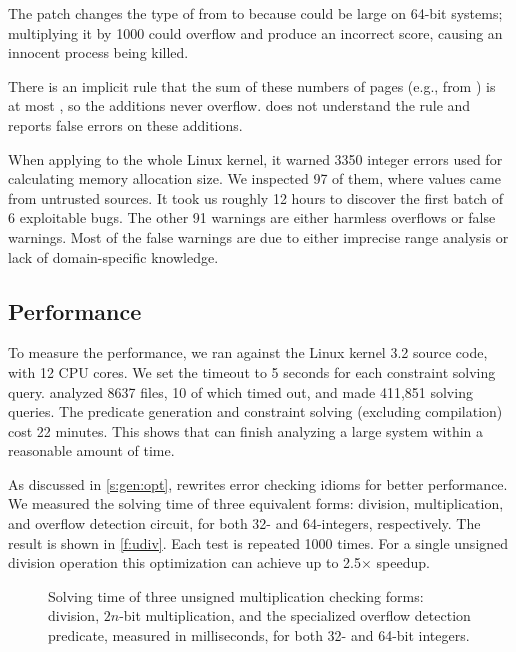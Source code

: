 The patch changes the type of  from  to  because
 could be large on 64-bit systems; multiplying it by
1000 could overflow and produce an incorrect score,
causing an innocent process being killed.

There is an implicit rule that the sum of these numbers of pages
(e.g., from ) is at most , so the
additions never overflow.  \sys does not understand the rule and
reports false errors on these additions.

When applying \sys to the whole Linux kernel,
it warned 3350 integer errors used for calculating
memory allocation size.  We inspected 97 of them,
where values came from untrusted sources. It took us roughly 12
hours to discover the first batch of 6 exploitable bugs.
The other 91 warnings are either harmless overflows or false warnings.
Most of the false warnings are due to either imprecise range analysis
or lack of domain-specific knowledge.


\subsection{Performance}
\label{s:eval:perf}

To measure the performance, we ran \sys against the Linux kernel
3.2 source code, with 12 CPU cores.  We set the timeout
to 5 seconds for each constraint solving query.   \sys analyzed
8637 files, 10 of which timed out, and made 411,851 solving queries.
The predicate generation and constraint solving (excluding compilation)
cost 22 minutes.  This shows that \sys can finish analyzing a large
system within a reasonable amount of time.

As discussed in \autoref{s:gen:opt}, \sys rewrites error checking
idioms for better performance.  We measured the solving time of three
equivalent forms: division, multiplication, and overflow detection
circuit, for both 32- and 64-integers, respectively.  The result
is shown in \autoref{f:udiv}.  Each test is repeated 1000 times.
For a single unsigned division operation this optimization can
achieve up to 2.5$\times$ speedup.

\begin{figure}
\centering

\caption{Solving time of three unsigned multiplication checking forms:
division, $2n$-bit multiplication, and the specialized overflow
detection predicate, measured in milliseconds, for both 32- and 64-bit
integers.}
\label{f:udiv}
\end{figure}
